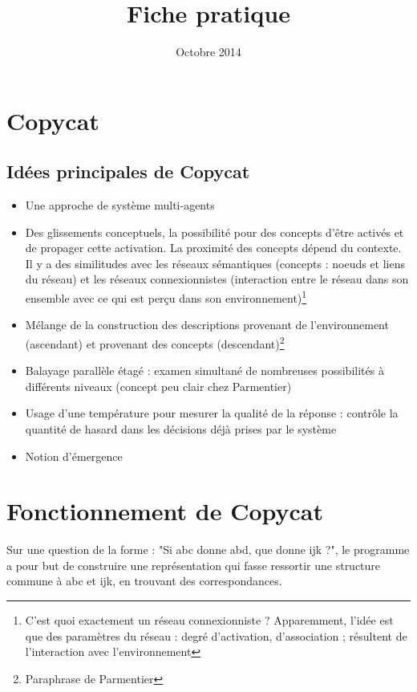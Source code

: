 \documentclass{article}           %
\title{Fiche pratique}     %
\author{}        %
\date{Octobre 2014}
\begin{document}
\maketitle

\section{Copycat}
\subsection{Idées principales de Copycat}

\begin{itemize}
 \item Une approche de système multi-agents
 \item Des glissements conceptuels, la possibilité pour des concepts d'être activés et de propager cette activation. La proximité des concepts dépend du contexte. Il y a des similitudes avec les réseaux sémantiques (concepts : noeuds et liens du réseau) et les réseaux connexionnistes (interaction entre le réseau dans son ensemble avec ce qui est perçu dans son environnement)\footnote{C'est quoi exactement un réseau connexionniste ? Apparemment, l'idée est que des paramètres du réseau : degré d'activation, d'association ; résultent de l'interaction avec l'environnement}
 \item Mélange de la construction des descriptions provenant de l'environnement (ascendant) et provenant des concepts (descendant)\footnote{Paraphrase de Parmentier}
 
\item Balayage parallèle étagé : examen simultané de nombreuses possibilités à différents niveaux (concept peu clair chez Parmentier)

\item Usage d'une température pour mesurer la qualité de la réponse : contrôle la quantité de hasard dans les décisions déjà prises par le système

\item Notion d'émergence
\end{itemize}

\section{Fonctionnement de Copycat}

Sur une question de la forme : "Si abc donne abd, que donne ijk ?", le programme a pour but de construire une représentation qui fasse ressortir une structure commune à abc et ijk, en trouvant des correspondances.
\end{document}
